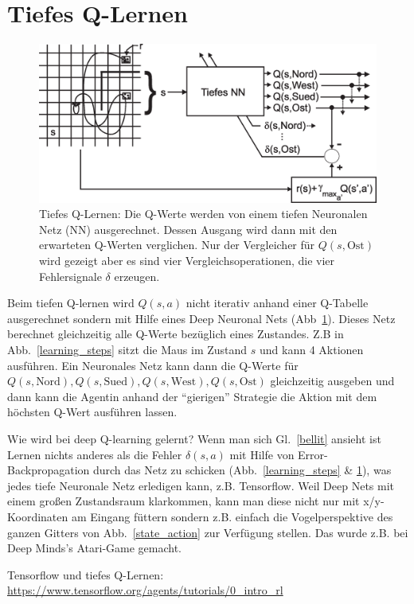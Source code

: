 \documentclass[12pt]{article}
\begin{document}
\section{Tiefes Q-Lernen}
\begin{figure}[!hbt]
\begin{center}
\mbox{\includegraphics[width=\textwidth]{dqn}}
\end{center}
\caption{Tiefes Q-Lernen: Die Q-Werte werden von einem tiefen
  Neuronalen Netz (NN) ausgerechnet. Dessen Ausgang wird dann mit den
  erwarteten Q-Werten verglichen. Nur der Vergleicher für $Q(s,\textrm{Ost})$
  wird gezeigt aber es sind vier Vergleichsoperationen, die vier
  Fehlersignale $\delta$ erzeugen.
\label{dqn}}
\end{figure}
Beim tiefen Q-lernen wird $Q(s,a)$ nicht iterativ anhand einer
Q-Tabelle ausgerechnet sondern mit Hilfe eines Deep Neuronal Nets
(Abb~\ref{dqn}). Dieses Netz berechnet gleichzeitig alle Q-Werte
bezüglich eines Zustandes. Z.B in Abb.~\ref{learning_steps} sitzt die
Maus im Zustand $s$ und kann 4 Aktionen ausführen. Ein Neuronales Netz
kann dann die Q-Werte für $Q(s,\textrm{Nord}), Q(s,\textrm{Sued}),
Q(s,\textrm{West}), Q(s,\textrm{Ost})$ gleichzeitig ausgeben und dann
kann die Agentin anhand der ``gierigen'' Strategie die Aktion mit dem
höchsten Q-Wert ausführen lassen.

Wie wird bei deep Q-learning gelernt? Wenn man sich Gl.~\ref{bellit}
ansieht ist Lernen nichts anderes als die Fehler $\delta(s,a)$ mit
Hilfe von Error-Backpropagation durch das Netz zu schicken
(Abb.~\ref{learning_steps} \& \ref{dqn}), was jedes tiefe Neuronale Netz erledigen kann,
z.B. Tensorflow. Weil Deep Nets mit einem großen Zustandsraum
klarkommen, kann man diese nicht nur mit x/y-Koordinaten am Eingang
füttern sondern z.B. einfach die Vogelperspektive des ganzen Gitters
von Abb.~\ref{state_action} zur Verfügung stellen. Das wurde z.B. bei
Deep Minds's Atari-Game gemacht.

Tensorflow und tiefes Q-Lernen:
\url{https://www.tensorflow.org/agents/tutorials/0_intro_rl}
\end{document}
